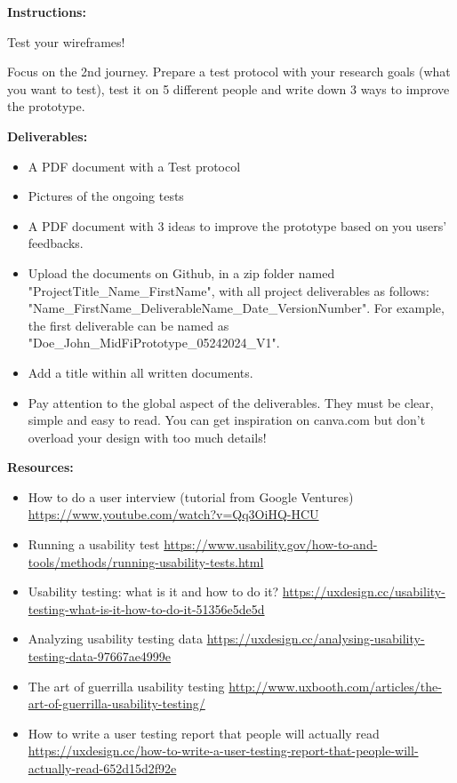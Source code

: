 \makeheaderfiles

\textbf{Instructions:}

Test your wireframes!

Focus on the 2nd journey. Prepare a test protocol with your research goals (what you want to test), test it on 5 different people and write down 3 ways to improve the prototype.

\textbf{Deliverables:}

\begin{itemize}
\item A PDF document with a Test protocol
\item Pictures of the ongoing tests
\item A PDF document with 3 ideas to improve the prototype based on you users' feedbacks.
\item Upload the documents on Github, in a zip folder named "ProjectTitle\_Name\_FirstName", with all project deliverables as follows: "Name\_FirstName\_DeliverableName\_Date\_VersionNumber".  For example, the first deliverable can be named as "Doe\_John\_MidFiPrototype\_05242024\_V1".
\item Add a title within all written documents.
\item Pay attention to the global aspect of the deliverables. They must be clear, simple and easy to read. You can get inspiration on canva.com but don't overload your design with too much details!
\end{itemize}

\textbf{Resources:}

\begin{itemize}
\item How to do a user interview (tutorial from Google Ventures) \url{https://www.youtube.com/watch?v=Qq3OiHQ-HCU}
\item Running a usability test \url{https://www.usability.gov/how-to-and-tools/methods/running-usability-tests.html}
\item Usability testing: what is it and how to do it? \url{https://uxdesign.cc/usability-testing-what-is-it-how-to-do-it-51356e5de5d}
\item Analyzing usability testing data \url{https://uxdesign.cc/analysing-usability-testing-data-97667ae4999e}
\item The art of guerrilla usability testing \url{http://www.uxbooth.com/articles/the-art-of-guerrilla-usability-testing/}
\item How to write a user testing report that people will actually read \url{https://uxdesign.cc/how-to-write-a-user-testing-report-that-people-will-actually-read-652d15d2f92e}
\end{itemize}

